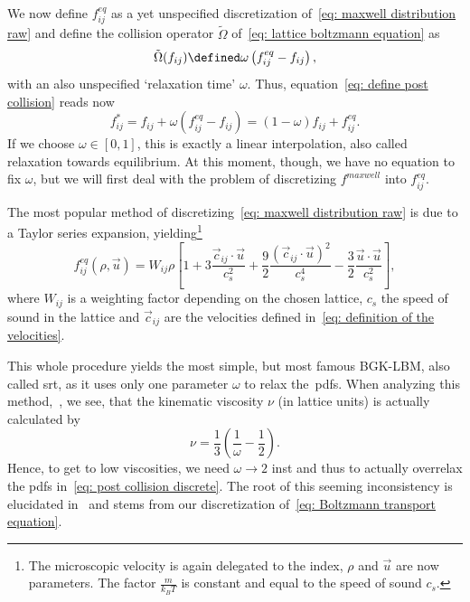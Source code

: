 We now define $f_{ij}^{eq}$ as a yet unspecified discretization of~\eqref{eq: maxwell distribution raw} and define the collision operator $\tilde{\Omega}$ of~\eqref{eq: lattice boltzmann equation} as
\begin{equation}
  \tilde{\Omega}(f_{ij}) \defined \omega \left(f_{ij}^{eq} - f_{ij}\right),
\end{equation}
with an also unspecified `relaxation time' $\omega$.
Thus, equation~\eqref{eq: define post collision} reads now
\begin{equation}
  \label{eq: post collision discrete}
  f_{ij}^* = f_{ij} + \omega \left(f_{ij}^{eq} - f_{ij}\right) = (1-\omega)f_{ij} + f_{ij}^{eq}.
\end{equation}
If we choose $\omega\in[0,1]$, this is exactly a linear interpolation, also called relaxation towards equilibrium.
At this moment, though, we have no equation to fix $\omega$, but we will first deal with the problem of discretizing $f^{maxwell}$ into $f_{ij}^{eq}$.

The most popular method of discretizing~\eqref{eq: maxwell distribution raw} is due to a Taylor series expansion, yielding\footnote{The microscopic velocity is again delegated to the index, $\rho$ and $\vec{u}$ are now parameters. The factor $\frac{m}{k_B T}$ is constant and equal to the speed of sound $c_s$.}
\begin{equation}
  \label{eq: equilibrium particle distributions}
  f_{ij}^{eq}(\rho,\vec{u}) = W_{ij}\rho
  \left[
    1
    + 3\frac{\vec{c}_{ij} \cdot \vec{u}}{c_s^2}
    + \frac{9}{2}\frac{{(\vec{c}_{ij} \cdot \vec{u})}^2}{c_s^4}
    - \frac{3}{2}\frac{\vec{u} \cdot \vec{u}}{c_s^2}
  \right],
\end{equation}
where $W_{ij}$ is a weighting factor depending on the chosen lattice, $c_s$ the speed of sound in the lattice and $\vec{c}_{ij}$ are the velocities defined in~\eqref{eq: definition of the velocities}.

This whole procedure yields the most simple, but most famous BGK-LBM, also called \gls{srt}, as it uses only one parameter $\omega$ to relax the~\glspl{pdf}.
When analyzing this method,~\cite[Section 5.2.3]{wolf2000lattice}, we see, that the kinematic viscosity $\nu$ (in lattice units) is actually calculated by
\begin{equation}
  \nu = \frac{1}{3}\left(\frac{1}{\omega} - \frac{1}{2}\right).
\end{equation}
Hence, to get to low viscosities, we need $\omega \rightarrow 2$ inst and thus to actually overrelax the \glspl{pdf} in~\eqref{eq: post collision discrete}.
The root of this seeming inconsistency is elucidated in~\cite[Section 4]{karlin2006elements} and stems from our discretization of~\eqref{eq: Boltzmann transport equation}.

